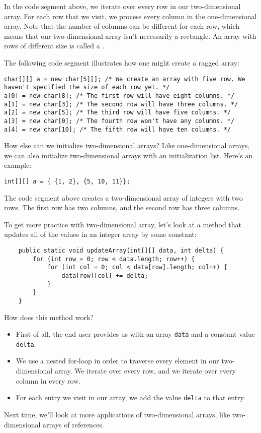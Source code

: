 In the code segment above, we iterate over every row in our two-dimensional array. For each row that we visit, we process every column in the one-dimensional array. Note that the number of columns can be different for each row, which means that our two-dimensional array isn't necessarily a rectangle. An array with rows of different size is called a . 

The following code segment illustrates how one might create a ragged array:


\begin{lstlisting}
char[][] a = new char[5][]; /* We create an array with five row. We haven't specified the size of each row yet. */
a[0] = new char[8]; /* The first row will have eight columns. */
a[1] = new char[3]; /* The second row will have three columns. */
a[2] = new char[5]; /* The third row will have five columns. */
a[3] = new char[0]; /* The fourth row won't have any columns. */
a[4] = new char[10]; /* The fifth row will have ten columns. */
\end{lstlisting}


How else can we initialize two-dimensional arrays? Like one-dimensional arrays, we can also initialize two-dimensional arrays with an initialization list. Here's an example:

\begin{lstlisting}
int[][] a = { {1, 2}, {5, 10, 11}};
\end{lstlisting}

The code segment above creates a two-dimensional array of integers with two rows. The first row has two columns, and the second row has three columns. 

To get more practice with two-dimensional array, let's look at a method that updates all of the values in an integer array by some constant:

\begin{lstlisting}
	public static void updateArray(int[][] data, int delta) {
		for (int row = 0; row < data.length; row++) {
			for (int col = 0; col < data[row].length; col++) {
				data[row][col] += delta;
			}
		}		
	}
\end{lstlisting}

How does this method work?

\begin{itemize}
    \item First of all, the end user provides us with an array \verb!data! and a constant value \verb!delta!. 
    \item We use a nested for-loop in order to traverse every element in our two-dimensional array. We iterate over every row, and we iterate over every column in every row. 
    \item For each entry we visit in our array, we add the value \verb!delta! to that entry.
\end{itemize}

Next time, we'll look at more applications of two-dimensional arrays, like two-dimensional arrays of references.